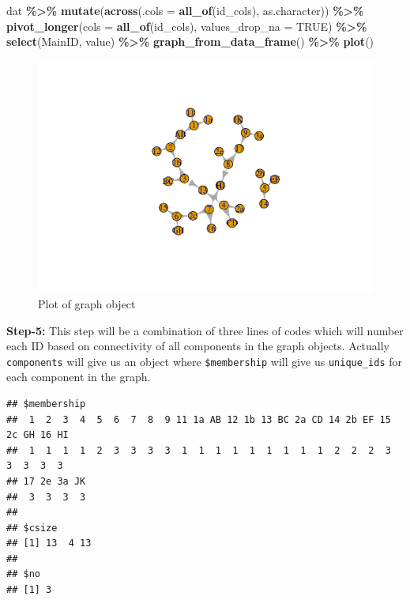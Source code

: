 \documentclass[
]{book}
\newenvironment{Shaded}{\begin{snugshade}}{\end{snugshade}}
\newcommand{\AttributeTok}[1]{\textcolor[rgb]{0.13,0.29,0.53}{#1}}
\newcommand{\ConstantTok}[1]{\textcolor[rgb]{0.56,0.35,0.01}{#1}}
\newcommand{\FunctionTok}[1]{\textcolor[rgb]{0.13,0.29,0.53}{\textbf{#1}}}
\newcommand{\NormalTok}[1]{#1}
\newcommand{\SpecialCharTok}[1]{\textcolor[rgb]{0.81,0.36,0.00}{\textbf{#1}}}
\begin{document}
\begin{Shaded}
\begin{Highlighting}[]
\NormalTok{dat }\SpecialCharTok{\%\textgreater{}\%} 
  \FunctionTok{mutate}\NormalTok{(}\FunctionTok{across}\NormalTok{(}\AttributeTok{.cols =} \FunctionTok{all\_of}\NormalTok{(id\_cols), as.character)) }\SpecialCharTok{\%\textgreater{}\%} 
  \FunctionTok{pivot\_longer}\NormalTok{(}\AttributeTok{cols =} \FunctionTok{all\_of}\NormalTok{(id\_cols), }
               \AttributeTok{values\_drop\_na =} \ConstantTok{TRUE}\NormalTok{) }\SpecialCharTok{\%\textgreater{}\%} 
  \FunctionTok{select}\NormalTok{(MainID, value) }\SpecialCharTok{\%\textgreater{}\%} 
  \FunctionTok{graph\_from\_data\_frame}\NormalTok{() }\SpecialCharTok{\%\textgreater{}\%}
  \FunctionTok{plot}\NormalTok{()}
\end{Highlighting}
\end{Shaded}

\begin{figure}

{\centering \includegraphics{DauR_files/figure-latex/igraph2-1} 

}

\caption{Plot of graph object}\label{fig:igraph2}
\end{figure}

\textbf{Step-5:} This step will be a combination of three lines of codes which will number each ID based on connectivity of all components in the graph objects. Actually \texttt{components} will give us an object where \texttt{\$membership} will give us \texttt{unique\_ids} for each component in the graph.

\begin{verbatim}
## $membership
##  1  2  3  4  5  6  7  8  9 11 1a AB 12 1b 13 BC 2a CD 14 2b EF 15 2c GH 16 HI 
##  1  1  1  1  2  3  3  3  3  1  1  1  1  1  1  1  1  1  2  2  2  3  3  3  3  3 
## 17 2e 3a JK 
##  3  3  3  3 
## 
## $csize
## [1] 13  4 13
## 
## $no
## [1] 3
\end{verbatim}
\end{document}
